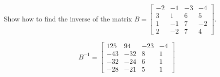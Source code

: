
\begin{exerciseStatement}


Show how to find the inverse of the matrix \(B= \left[\begin{array}{cccc}
-2 & -1 & -3 & -4 \\
3 & 1 & 6 & 5 \\
1 & -1 & 7 & -2 \\
2 & -2 & 7 & 4
\end{array}\right] \).


\end{exerciseStatement}
    
\begin{exerciseAnswer} 
\[B^{-1}= \left[\begin{array}{cccc}
125 & 94 & -23 & -4 \\
-43 & -32 & 8 & 1 \\
-32 & -24 & 6 & 1 \\
-28 & -21 & 5 & 1
\end{array}\right] \]
\end{exerciseAnswer}
    
